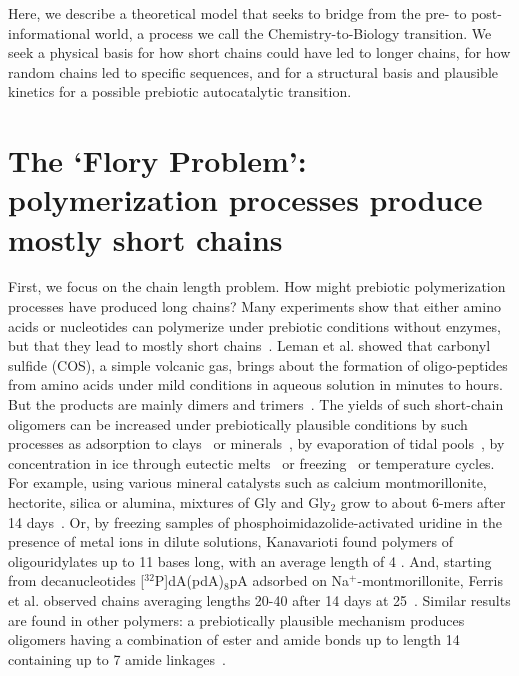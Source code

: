 \documentclass[journal=jacsat,manuscript=article,layout=twocolumn]{achemso}
\begin{document}
  Here, we describe a theoretical model that seeks to bridge from the pre- to post-informational 
world, a process we call the Chemistry-to-Biology transition.  We seek a physical basis for how 
short chains could have led to longer chains, for how random chains led to specific sequences, and 
for a structural basis and plausible kinetics for a possible prebiotic autocatalytic transition.
   
 \section{The `Flory Problem': polymerization processes produce mostly short chains}
 \label{sec:flory} 

First, we focus on the chain length problem.  How might prebiotic polymerization processes have 
produced long chains?  Many experiments show that either amino acids or nucleotides can polymerize 
under prebiotic conditions without enzymes, but that they lead to mostly short 
chains~\cite{Shock1992,Martin1998,PAECHT-HOROWITZ1970,Leman2004a,Orgel2004}.  Leman et al. showed 
that carbonyl sulfide (COS), a simple volcanic gas, brings about the formation of oligo-peptides 
from amino acids under mild conditions in aqueous solution in minutes to hours. But the products are 
mainly dimers and trimers~\cite{Leman2004a}.  The yields of such short-chain oligomers can be 
increased under prebiotically plausible conditions by such processes as adsorption to 
clays~\cite{Rao1980,Lambert2008} or minerals~\cite{Bernal1949,Ferris1996}, by evaporation of tidal 
pools~\cite{Nelson2001}, by concentration in ice through eutectic melts~\cite{Kanavarioti2001} or 
freezing~\cite{Bada2004} or temperature cycles.  For example, using various mineral catalysts such 
as calcium montmorillonite, hectorite, silica or alumina, mixtures of Gly and Gly$_2$ grow to about 
6-mers after 14 days~\cite{Rode1997,Rode1999}.  Or, by freezing samples of 
phosphoimidazolide-activated uridine in the presence of metal ions in dilute solutions, Kanavarioti 
found polymers of oligouridylates up to 11 bases long, with an average length of 4 
\cite{Kanavarioti2001}.  And, starting from decanucleotides [$^{32}$P]dA(pdA)$_8$pA adsorbed on 
Na$^+$-montmorillonite, Ferris et al. observed chains averaging lengths 20-40 after 14 days at 
25\textcelsius\ \cite{Ferris1996}.  Similar results are found in other polymers: a prebiotically 
plausible mechanism produces oligomers having a combination of ester and amide bonds up to length 14 
containing up to 7 amide linkages~\cite{Forsythe2015}.  
\end{document}
